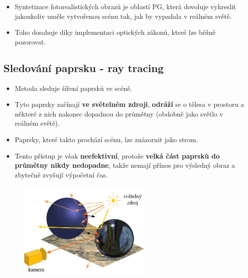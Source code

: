\begin{itemize}
\item Syntetizace fotorealistických obrazů je oblastí PG, která dovoluje vykreslit jakoukoliv uměle vytvořenou scénu tak, jak by vypadala v reálném světě. 
\item Toho dosahuje díky implementaci optických zákonů, které lze běžně pozorovat.
\end{itemize}

\subsection{Sledování paprsku - ray tracing}
\begin{itemize}
 \item Metoda sleduje šíření paprsků ve scéně.
 \item Tyto paprsky začínají \textbf{ve světelném zdroji}, \textbf{odráží} se o tělesa v prostoru a některé z nich nakonec dopadnou do průmětny (obdobně jako světlo v reálném světě).
 \item Paprsky, které takto prochází scénu, lze znázornit jako strom.
 \item Tento přístup je však \textbf{neefektivní}, protože \textbf{velká část paprsků do průmětny nikdy nedopadne}, takže nemají přínos pro výsledný obraz a zbytečně zvyšují výpočetní čas.
\end{itemize}
\begin{figure}[H]
\centering
\includegraphics[width=0.6\textwidth]{assets/6_ray_trace_svetlo}
\end{figure}

